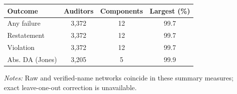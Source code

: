\documentclass[10pt]{article}
\begin{document}
\begin{minipage}{19cm}\fontsize{10}{12}\selectfont\setlength{\tabcolsep}{4pt}\renewcommand{\arraystretch}{1.12}


\centering
{}
\begin{threeparttable}
\begin{tabular}{p{}ccc}
\toprule
Outcome & Auditors & Components & Largest (\%) \\
\midrule
Any failure & 3,372 & 12 & 99.7 \\
Restatement & 3,372 & 12 & 99.7 \\
Violation & 3,372 & 12 & 99.7 \\
Abs. DA (Jones) & 3,205 & 5 & 99.9 \\
\bottomrule
\end{tabular}
\begin{tablenotes}\fontsize{9}{11}\selectfont
\item \raggedright \fontsize{9}{11}\selectfont \textit{Notes:} Raw and verified-name networks coincide in these summary measures; exact leave-one-out correction is unavailable.
\end{tablenotes}
\end{threeparttable}

\end{minipage}
\end{document}

